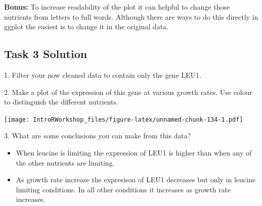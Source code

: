 \documentclass[]{book}
\newenvironment{Shaded}{\begin{snugshade}}{\end{snugshade}}
\newcommand{\DataTypeTok}[1]{\textcolor[rgb]{0.13,0.29,0.53}{#1}}
\newcommand{\KeywordTok}[1]{\textcolor[rgb]{0.13,0.29,0.53}{\textbf{#1}}}
\newcommand{\NormalTok}[1]{#1}
\newcommand{\OperatorTok}[1]{\textcolor[rgb]{0.81,0.36,0.00}{\textbf{#1}}}
\newcommand{\StringTok}[1]{\textcolor[rgb]{0.31,0.60,0.02}{#1}}
\providecommand{\tightlist}{%
  \setlength{\itemsep}{0pt}\setlength{\parskip}{0pt}}
\begin{document}
\textbf{Bonus:} To increase readability of the plot it can helpful to change those nutrients from letters to full words. Although there are ways to do this directly in ggplot the easiest is to change it in the original data.

\hypertarget{task-3-solution}{%
\subsection*{Task 3 Solution}\label{task-3-solution}}

1. Filter your now cleaned data to contain only the gene LEU1.

\begin{Shaded}
\end{Shaded}

2. Make a plot of the expression of this gene at various growth rates. Use colour to distinguish the different nutrients.

\begin{Shaded}
\end{Shaded}

\texttt{[image: IntroRWorkshop\_files/figure-latex/unnamed-chunk-134-1.pdf]}

3. What are some conclusions you can make from this data?

\begin{itemize}
\tightlist
\item
  When leucine is limiting the expression of LEU1 is higher than when any of the other nutrients are limiting.
\item
  As growth rate increase the expresison of LEU1 decreases but only in leucine limiting conditions. In all other conditions it increases as growth rate increases.
\end{itemize}
\end{document}
